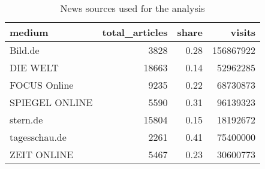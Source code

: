 \begin{table}[ht]
\centering
\begin{tabular}{lrrr}
  \hline
medium & total\_articles & share & visits \\ 
  \hline
Bild.de & 3828 & 0.28 & 156867922 \\ 
  DIE WELT & 18663 & 0.14 & 52962285 \\ 
  FOCUS Online & 9235 & 0.22 & 68730873 \\ 
  SPIEGEL ONLINE & 5590 & 0.31 & 96139323 \\ 
  stern.de & 15804 & 0.15 & 18192672 \\ 
  tagesschau.de & 2261 & 0.41 & 75400000 \\ 
  ZEIT ONLINE & 5467 & 0.23 & 30600773 \\ 
   \hline
\end{tabular}
\caption{News sources used for the analysis} 
\end{table}
